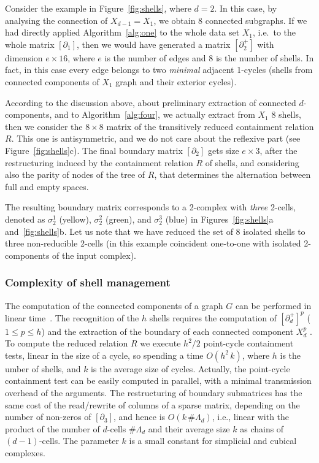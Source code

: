 \begin{example}\label{example4}
Consider the example in Figure~\ref{fig:shells}, where $d=2$.
In this case, by analysing the connection of $X_{d-1}=X_1$, {we obtain 8 connected subgraphs}. 
If we had directly applied Algorithm~\ref{alg:one} to the whole data set $X_1$, i.e.~to the whole matrix $[\partial_1]$, then we would have generated a matrix $[\partial_2^+]$ with dimension $e\times 16$, where $e$ is the number of edges and 8 is the number of shells. In fact, in this case every edge belongs to two {\emph{minimal} adjacent 1-cycles (shells from connected components of $X_1$ graph and their exterior cycles). }

According to the discussion above, about preliminary extraction of connected $d$-components, and to Algorithm~\ref{alg:four}, we actually extract from $X_1$ 8 shells, then 
we consider the $8\times 8$ matrix of the transitively reduced containment relation $R$. This one is antisymmetric, and we do not care about the reflexive part (see Figure~\ref{fig:shells}c).
{The final boundary matrix $[\partial_2]$ gets size $e\times 3$,} after the restructuring induced by the containment relation $R$ of shells, and considering also the parity of nodes of the tree of $R$, that determines the alternation between full and empty spaces.

{The resulting boundary matrix corresponds to} a 2-complex with \emph{three} 2-cells, denoted as $\sigma_2^1$ (yellow), $\sigma_2^2$ (green), and $\sigma_2^3$ (blue) in Figures~\ref{fig:shells}a and~\ref{fig:shells}b. Let us note that we have reduced the set of 8 isolated shells to three non-reducible 2-cells (in this example coincident one-to-one with isolated 2-components of the input complex).

\end{example}



\subsubsection{Complexity of shell management}
\label{sec:inclusion}

The computation of the connected components of a graph $G$ can be performed in linear time~\cite{Hopcroft:1973:AEA:362248.362272}. The recognition of the $h$ shells requires the computation of $[\partial_{d}^+]^p$ ($1\leq p\leq h$) and the extraction of the boundary of each connected component $X_{d}^p$ . To compute the reduced relation $R$ we execute $h^2/2$ point-cycle containment tests, linear in the size of a cycle, so spending a time $O(h^2\, k)$, where $h$ is the  umber of shells, and $k$ is the average size of cycles. Actually, the point-cycle containment test can be easily computed in parallel, with a minimal transmission overhead of the arguments.
The restructuring of boundary submatrices has the same cost of the read/rewrite of columns of a sparse matrix, depending on the number of non-zeros of $[\partial_3]$, and hence is $O(k\, \#\Lambda_d)$, i.e., linear with the product of the number of $d$-cells  $\#\Lambda_d$ and their average size $k$ as chains of $(d-1)$-cells. The parameter $k$ is a small constant for simplicial and cubical complexes.  




